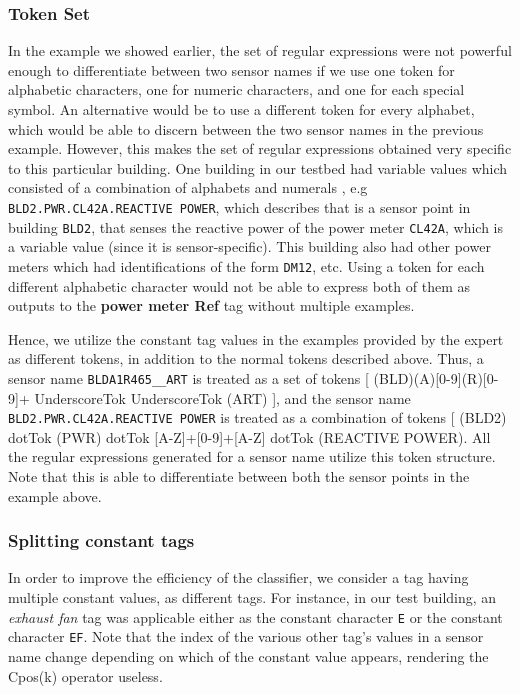 \subsubsection{Token Set}

In the example we showed earlier, the set of regular expressions were not powerful enough to differentiate between two sensor names if we use one token for alphabetic characters, one for numeric characters, and one for each special symbol. An alternative would be to use a different token for every alphabet, which would be able to discern between the two sensor names in the previous example. However, this makes the set of regular expressions obtained very specific to this particular building. One building in our testbed had variable values which consisted of a combination of alphabets and numerals , e.g \texttt{BLD2.PWR.CL42A.REACTIVE POWER}, which describes that is a sensor point in building \texttt{BLD2}, that senses the reactive power of the power meter \texttt{CL42A}, which is a variable value (since it is sensor-specific). This building also had other power meters which had identifications of the form \texttt{DM12}, etc. Using a token for each different alphabetic character would not be able to express both of them as outputs to the {\bf power meter Ref} tag without multiple examples.

Hence, we utilize the constant tag values in the examples provided by the expert as different tokens, in addition to the normal tokens described above. Thus, a sensor name \texttt{BLDA1R465\_\_ART} is treated as a set of tokens [ (BLD)(A)[0-9](R)[0-9]+ UnderscoreTok UnderscoreTok (ART) ], and the sensor name \texttt{BLD2.PWR.CL42A.REACTIVE POWER} is treated as a combination of tokens [ (BLD2) dotTok (PWR) dotTok [A-Z]+[0-9]+[A-Z] dotTok (REACTIVE POWER). All the regular expressions generated for a sensor name utilize this token structure. Note that this is able to differentiate between both the sensor points in the example above. 


\subsubsection{Splitting constant tags}

In order to improve the efficiency of the classifier, we consider a tag having multiple constant values, as different tags. For instance, in our test building, an {\it exhaust fan} tag was applicable either as the constant character \texttt{E} or the constant character \texttt{EF}. Note that the index of the various other tag's values in a sensor name change depending on which of the constant value appears, rendering the Cpos(k) operator useless. 

